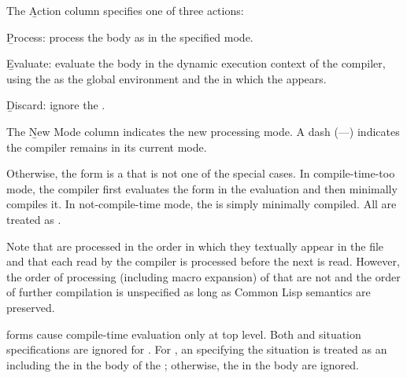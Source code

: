 The \b{Action} column specifies one of three actions:

\beginlist

 \item{}\b{Process:} process the body as  in the
specified mode.
 
 \item{}\b{Evaluate:} evaluate the body in the dynamic execution
context of the compiler, using the  as
the global environment and the  in which
the  appears.
 
\item{}\b{Discard:} ignore the .
\endlist

The \b{New Mode} column indicates the new processing mode. 
A dash (---) indicates the compiler remains in its current mode.

  Otherwise, the form is a  that
is not one of the special cases.  In compile-time-too mode, the
compiler first evaluates the form in the evaluation 
 and then minimally compiles it.  In not-compile-time
mode, the  is simply minimally compiled.  All 
are treated as .

Note that  are processed in the order in
which they textually appear in the file and that each 
 read by the compiler is processed before the next is
read.  However, the order of processing (including macro expansion) of
 that are not  and the order of
further compilation is unspecified as long as Common Lisp semantics
are preserved.

\endlist 
 
 forms cause compile-time evaluation only at
top level.  Both  and  situation specifications
are ignored for . For , 
an 
specifying the  situation is treated as an 
including the  in the body of the  ;
otherwise, the  in the body are ignored.




